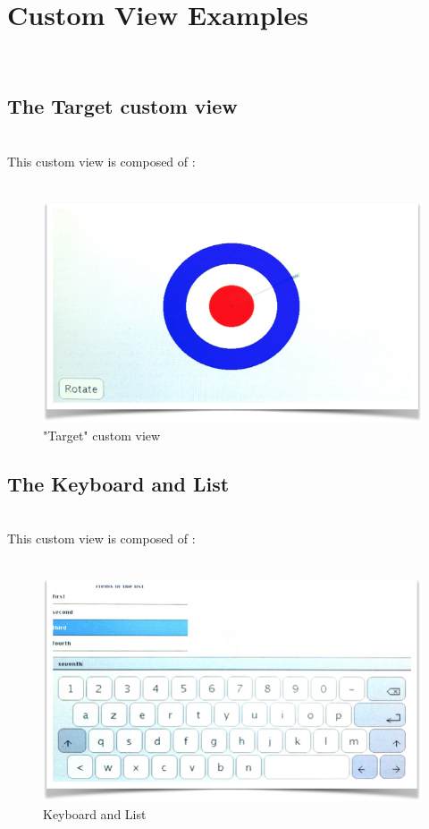 \documentclass[a4paper,11pt]{extarticle}
\begin{document}
\newpage
\section{Custom View Examples}

~\\

\newpage
\subsection{The Target custom view}

~\\ This custom view is composed of :
~\\
~\\

\begin{figure}[htbp]
   \centering
   \includegraphics[scale=0.55]{AWFig19.png} 
   \caption{"Target" custom view}
   \label{fig:19 }
\end{figure}


\newpage
\subsection{The Keyboard and List}

~\\ This custom view is composed of :
~\\
~\\

\begin{figure}[htbp]
   \centering
   \includegraphics[scale=0.55]{AWFig21.png} 
   \caption{Keyboard and List}
   \label{fig:21 }
\end{figure}
\end{document}
